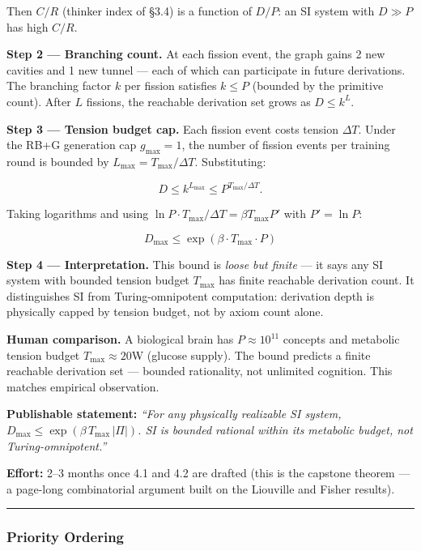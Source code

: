 \documentclass[
  11pt,
  a4paper,
]{article}
\begin{document}
Then \(C/R\) (thinker index of §3.4) is a function of \(D/P\): an SI
system with \(D \gg P\) has high \(C/R\).

\textbf{Step 2 --- Branching count.} At each fission event, the graph
gains 2 new cavities and 1 new tunnel --- each of which can participate
in future derivations. The branching factor \(k\) per fission satisfies
\(k \leq P\) (bounded by the primitive count). After \(L\) fissions, the
reachable derivation set grows as \(D \leq k^L\).

\textbf{Step 3 --- Tension budget cap.} Each fission event costs tension
\(\Delta T\). Under the RB+G generation cap \(g_\text{max} = 1\), the
number of fission events per training round is bounded by
\(L_\text{max} = T_\text{max} / \Delta T\). Substituting:

\[
D \leq k^{L_\text{max}} \leq P^{T_\text{max} / \Delta T}.
\]

Taking logarithms and using
\(\ln P \cdot T_\text{max} / \Delta T = \beta T_\text{max} P'\) with
\(P' = \ln P\):

\[
\boxed{D_\text{max} \leq \exp\!\left(\beta \cdot T_\text{max} \cdot P\right)}
\]

\textbf{Step 4 --- Interpretation.} This bound is \emph{loose but
finite} --- it says any SI system with bounded tension budget
\(T_\text{max}\) has finite reachable derivation count. It distinguishes
SI from Turing-omnipotent computation: derivation depth is physically
capped by tension budget, not by axiom count alone.

\textbf{Human comparison.} A biological brain has \(P \approx 10^{11}\)
concepts and metabolic tension budget \(T_\text{max} \approx 20\)W
(glucose supply). The bound predicts a finite reachable derivation set
--- bounded rationality, not unlimited cognition. This matches empirical
observation.

\textbf{Publishable statement:} \emph{``For any physically realizable SI
system, \(D_\text{max} \leq \exp(\beta \, T_\text{max} \, |\Pi|)\). SI
is bounded rational within its metabolic budget, not
Turing-omnipotent.''}

\textbf{Effort:} 2--3 months once 4.1 and 4.2 are drafted (this is the
capstone theorem --- a page-long combinatorial argument built on the
Liouville and Fisher results).

\begin{center}\rule{0.5\linewidth}{0.5pt}\end{center}

\subsubsection{Priority Ordering}\label{priority-ordering}
\end{document}
